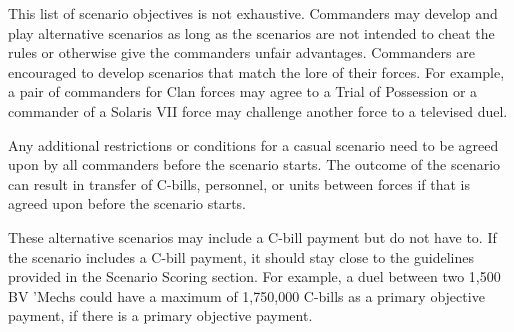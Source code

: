 This list of scenario objectives is not exhaustive.
Commanders may develop and play alternative scenarios as long as the scenarios are not intended to cheat the rules or otherwise give the commanders unfair advantages.
Commanders are encouraged to develop scenarios that match the lore of their forces.
For example, a pair of commanders for Clan forces may agree to a Trial of Possession or a commander of a Solaris VII force may challenge another force to a televised duel.

Any additional restrictions or conditions for a casual scenario need to be agreed upon by all commanders before the scenario starts.
The outcome of the scenario can result in transfer of C-bills, personnel, or units between forces if that is agreed upon before the scenario starts.

These alternative scenarios may include a C-bill payment but do not have to.
If the scenario includes a C-bill payment, it should stay close to the guidelines provided in the Scenario Scoring section.
For example, a duel between two 1,500 BV 'Mechs could have a maximum of 1,750,000 C-bills as a primary objective payment, if there is a primary objective payment.
